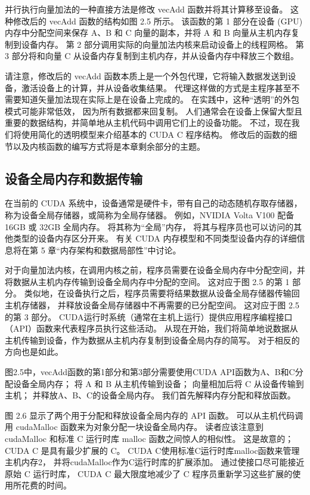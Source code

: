 并行执行向量加法的一种直接方法是修改 vecAdd 函数并将其计算移至设备。 这种修改后的 vecAdd 函数的结构如图 2.5 所示。 
该函数的第 1 部分在设备 (GPU) 内存中分配空间来保存 A、B 和 C 向量的副本，并将 A 和 B 向量从主机内存复制到设备内存。 
第 2 部分调用实际的向量加法内核来启动设备上的线程网格。 
第 3 部分将和向量 C 从设备内存复制到主机内存，并从设备内存中释放三个数组。

请注意，修改后的 vecAdd 函数本质上是一个外包代理，它将输入数据发送到设备，激活设备上的计算，并从设备收集结果。 
代理这样做的方式是主程序甚至不需要知道矢量加法现在实际上是在设备上完成的。 在实践中，这种“透明”的外包模式可能非常低效，
因为所有数据都来回复制。 人们通常会在设备上保留大型且重要的数据结构，并简单地从主机代码中调用它们上的设备功能。 
不过，现在我们将使用简化的透明模型来介绍基本的 CUDA C 程序结构。 
修改后的函数的细节以及内核函数的编写方式将是本章剩余部分的主题。

\subsection{设备全局内存和数据传输}
在当前的 CUDA 系统中，设备通常是硬件卡，带有自己的动态随机存取存储器，称为设备全局存储器，或简称为全局存储器。 
例如，NVIDIA Volta V100 配备 16GB 或 32GB 全局内存。 将其称为“全局”内存，
将其与程序员也可以访问的其他类型的设备内存区分开来。 
有关 CUDA 内存模型和不同类型设备内存的详细信息将在第 5 章“内存架构和数据局部性”中讨论。

对于向量加法内核，在调用内核之前，程序员需要在设备全局内存中分配空间，并将数据从主机内存传输到设备全局内存中分配的空间。 
这对应于图 2.5 的第 1 部分。 类似地，在设备执行之后，程序员需要将结果数据从设备全局存储器传输回主机存储器，
并释放设备全局存储器中不再需要的已分配空间。 这对应于图 2.5 的第 3 部分。 
CUDA运行时系统（通常在主机上运行）提供应用程序编程接口（API）函数来代表程序员执行这些活动。 
从现在开始，我们将简单地说数据从主机传输到设备，作为数据从主机内存复制到设备全局内存的简写。 对于相反的方向也是如此。

图2.5中，vecAdd函数的第1部分和第3部分需要使用CUDA API函数为A、B和C分配设备全局内存； 
将 A 和 B 从主机传输到设备； 向量相加后将 C 从设备传输到主机； 并释放A、B、C的设备全局内存。
我们首先解释内存分配和释放函数。

图 2.6 显示了两个用于分配和释放设备全局内存的 API 函数。 
可以从主机代码调用 cudaMalloc 函数来为对象分配一块设备全局内存。 
读者应该注意到 cudaMalloc 和标准 C 运行时库 malloc 函数之间惊人的相似性。 
这是故意的； CUDA C 是具有最少扩展的 C。 CUDA C使用标准C运行时库malloc函数来管理主机内存2，
并将cudaMalloc作为C运行时库的扩展添加。 通过使接口尽可能接近原始 C 运行时库，
CUDA C 最大限度地减少了 C 程序员重新学习这些扩展的使用所花费的时间。

